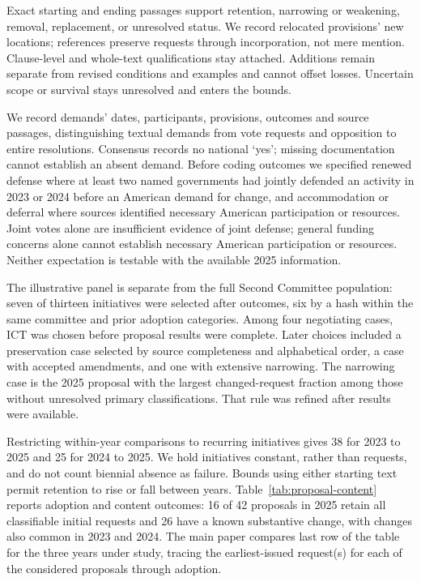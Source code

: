 \documentclass[10pt,authoryear]{elsarticle}
\begin{document}
Exact starting and ending passages support retention, narrowing or weakening, removal, replacement, or unresolved status. We record relocated provisions' new locations; references preserve requests through incorporation, not mere mention. Clause-level and whole-text qualifications stay attached. Additions remain separate from revised conditions and examples and cannot offset losses. Uncertain scope or survival stays unresolved and enters the bounds.

We record demands' dates, participants, provisions, outcomes and source passages, distinguishing textual demands from vote requests and opposition to entire resolutions. Consensus records no national `yes'; missing documentation cannot establish an absent demand. Before coding outcomes we specified renewed defense where at least two named governments had jointly defended an activity in 2023 or 2024 before an American demand for change, and accommodation or deferral where sources identified necessary American participation or resources. Joint votes alone are insufficient evidence of joint defense; general funding concerns alone cannot establish necessary American participation or resources. Neither expectation is testable with the available 2025 information.

The illustrative panel is separate from the full Second Committee population: seven of thirteen initiatives were selected after outcomes, six by a hash within the same committee and prior adoption categories. Among four negotiating cases, ICT was chosen before proposal results were complete. Later choices included a preservation case selected by source completeness and alphabetical order, a case with accepted amendments, and one with extensive narrowing. The narrowing case is the 2025 proposal with the largest changed-request fraction among those without unresolved primary classifications. That rule was refined after results were available.

Restricting within-year comparisons to recurring initiatives gives 38 for 2023 to 2025 and 25 for 2024 to 2025. We hold initiatives constant, rather than requests, and do not count biennial absence as failure. Bounds using either starting text permit retention to rise or fall between years. Table~\ref{tab:proposal-content} reports adoption and content outcomes: 16 of 42 proposals in 2025 retain all classifiable initial requests and 26 have a known substantive change, with changes also common in 2023 and 2024. The main paper compares last row of the table for the three years under study, tracing the earliest-issued request(s) for each of the considered proposals through adoption.
\end{document}
